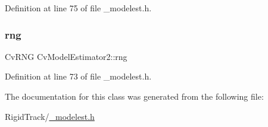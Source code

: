 Definition at line 75 of file \+\_\+modelest.\+h.

\mbox{\label{class_cv_model_estimator2_a5199037f573a5af1bd9f419e5a64e3e4}} 
\subsubsection{\texorpdfstring{rng}{rng}}
{\footnotesize\ttfamily Cv\+R\+NG Cv\+Model\+Estimator2\+::rng\hspace{0.3cm}{\ttfamily [protected]}}



Definition at line 73 of file \+\_\+modelest.\+h.



The documentation for this class was generated from the following file\+:\begin{DoxyCompactItemize}
\item 
Rigid\+Track/\hyperlink{__modelest_8h}{\+\_\+modelest.\+h}\end{DoxyCompactItemize}
